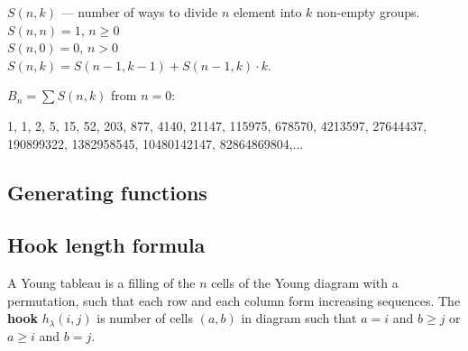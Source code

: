 $S(n, k)$ --- number of ways to divide $n$ element into $k$ non-empty groups.\\

$S(n, n) = 1$, $n \ge 0$\\
$S(n, 0) = 0$, $n > 0$\\

$S(n, k) = S(n - 1, k - 1) + S(n - 1, k) \cdot k$.


$B_n = \sum S(n, k)$ from $n = 0$:

1, 1, 2, 5, 15, 52, 203, 877, 4140, 21147, 115975, 678570, 4213597, 27644437, 190899322, 1382958545, 10480142147, 82864869804,...

\subsection{Generating functions}

\subsection{Hook length formula}
A Young tableau is a filling of the $n$ cells of the Young diagram with a permutation, 
such that each row and each column form increasing sequences. 
The \textbf{hook} $h_{\lambda}(i, j)$ is number of cells $(a, b)$ in diagram such that
$a = i$ and $b \ge j$ or $a \ge i$ and $b = j$.

